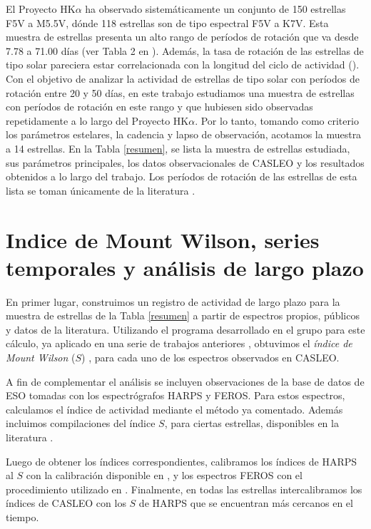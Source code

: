 \documentclass[baaa]{baaa}
\begin{document}
El Proyecto HK$\alpha$ ha observado sistemáticamente un conjunto de 150 estrellas F5V a M5.5V, dónde 118 estrellas son de tipo espectral F5V a K7V. Esta muestra de  estrellas presenta un alto rango de períodos de rotación que va desde 7.78 a 71.00 días (ver Tabla 2 en \citealt{Cincunegui07}).
Además, la tasa de rotación de las estrellas de tipo solar pareciera estar correlacionada con la longitud del ciclo de actividad (\citealt{BohmVitense07,Metcalfe16}). 
Con el objetivo de analizar la actividad de estrellas de tipo solar con períodos de rotación entre 20 y 50 días, en este trabajo estudiamos una muestra de estrellas con períodos de rotación en este rango y que hubiesen sido observadas repetidamente a lo largo del Proyecto HK$\alpha$. Por lo tanto, tomando como criterio los parámetros estelares, la  cadencia y lapso de observación, acotamos la muestra a 14 estrellas. En la Tabla \ref{resumen}, se lista la muestra de estrellas estudiada, sus parámetros principales, los datos observacionales de CASLEO y los resultados obtenidos a lo largo del trabajo. Los períodos de rotación de las estrellas de esta lista se toman únicamente de la literatura \citep{Cincunegui07}.


\section{Indice de Mount Wilson, series temporales y análisis de largo plazo}

En primer lugar, construimos un registro de actividad de largo plazo para la muestra de estrellas de la Tabla \ref{resumen} a partir de espectros propios, públicos y datos de la literatura. Utilizando el programa desarrollado en el grupo para este cálculo, ya aplicado en una serie de trabajos anteriores \citep{Ibanez19a,Ibanez19b,Ibanez20}, obtuvimos el \textit{índice de Mount Wilson} ($S$) \citep{Vaughan78}, para cada uno de los espectros observados en CASLEO.

A fin de complementar el análisis se incluyen observaciones de la base de datos de ESO tomadas con los espectrógrafos HARPS y FEROS. Para estos espectros, calculamos el índice de actividad mediante el método ya comentado. Además incluimos compilaciones del índice $S$, para ciertas estrellas, disponibles en la literatura \citep{Baum22}.

Luego de obtener los índices correspondientes, calibramos los índices de HARPS al $S$ con la calibración disponible en \cite{Lovis11}, y los espectros FEROS con el procedimiento utilizado en \cite{Jenkins08}. Finalmente, en todas las estrellas intercalibramos los índices de CASLEO con los $S$ de HARPS que se encuentran más cercanos en el tiempo.
\end{document}
